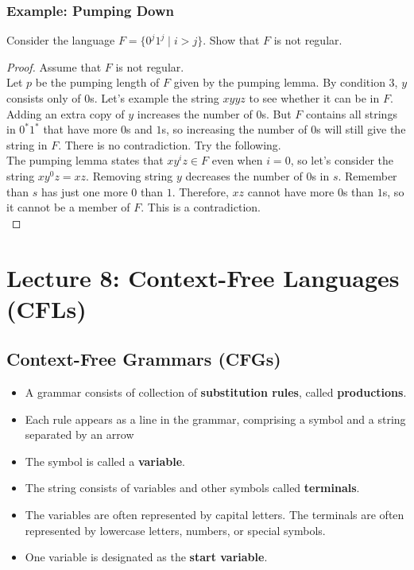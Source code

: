 \documentclass[11pt,a4paper]{article}
\begin{document}
\subsubsection{Example: Pumping Down}
\begin{example}
    Consider the language $F=\{0^j1^j\mid i>j\}$. Show that $F$ is not regular.

    \begin{proof}
        Assume that $F$ is not regular. \\

        Let $p$ be the pumping length of $F$ given by the pumping lemma. By condition 3, $y$ consists only of $0$s.
        Let's example the string $xyyz$ to see whether it can be in $F$. Adding an extra copy of $y$ increases the number of $0$s.
        But $F$ contains all strings in $0^*1^*$ that have more $0$s and $1$s, so increasing the number of $0$s will still give the string in $F$.
        There is no contradiction. Try the following. \\

        The pumping lemma states that $xy^iz\in F$ even when $i=0$, so let's consider the string $xy^0z=xz$.
        Removing string $y$ decreases the number of $0$s in $s$. Remember than $s$ has just one more $0$ than $1$.
        Therefore, $xz$ cannot have more $0$s than $1$s, so it cannot be a member of $F$. This is a contradiction. \\
    \end{proof}
\end{example}





\section{Lecture 8: Context-Free Languages (CFLs)}
\subsection{Context-Free Grammars (CFGs)}
\begin{itemize}
    \item A grammar consists of collection of \textbf{substitution rules}, called \textbf{productions}.
    \item Each rule appears as a line in the grammar, comprising a symbol and a string separated by an arrow
    \item The symbol is called a \textbf{variable}.
    \item The string consists of variables and other symbols called \textbf{terminals}.
    \item The variables are often represented by capital letters. The terminals are often represented by lowercase letters, numbers, or special symbols.
    \item One variable is designated as the \textbf{start variable}.
\end{itemize}
\end{document}
